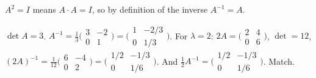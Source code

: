 \begin{solutions}
    \item $A^{2} = I$ means $A \cdot A = I$, so by definition of the inverse $A^{-1} = A$.
    \item $\det A = 3$. $A^{-1} = \tfrac{1}{3}\bigl(\begin{smallmatrix} 3 & -2 \\ 0 & 1 \end{smallmatrix}\bigr) = \bigl(\begin{smallmatrix} 1 & -2/3 \\ 0 & 1/3 \end{smallmatrix}\bigr)$. For $\lambda = 2$: $2 A = \bigl(\begin{smallmatrix} 2 & 4 \\ 0 & 6 \end{smallmatrix}\bigr)$, $\det = 12$, $(2A)^{-1} = \tfrac{1}{12}\bigl(\begin{smallmatrix} 6 & -4 \\ 0 & 2 \end{smallmatrix}\bigr) = \bigl(\begin{smallmatrix} 1/2 & -1/3 \\ 0 & 1/6 \end{smallmatrix}\bigr)$. And $\tfrac{1}{2}A^{-1} = \bigl(\begin{smallmatrix} 1/2 & -1/3 \\ 0 & 1/6 \end{smallmatrix}\bigr)$. Match.
\end{solutions}
